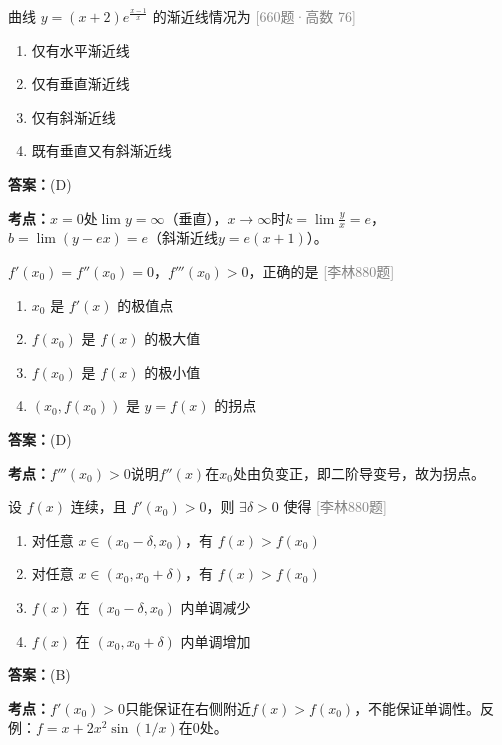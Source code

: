 \documentclass[12pt,a4paper]{ctexbook}
\newcommand{\src}[1]{\hfill\textcolor{gray}{\small\textsf{[#1]}}}
\newcommand{\ans}[1]{\begin{answerbox}\textbf{答案：}#1\end{answerbox}}
\newcommand{\kpt}[1]{\textbf{考点：}#1}
\begin{document}
\bigskip

\begin{exercise}[660题·渐近线概念]
曲线 $y=(x+2)e^{\frac{x-1}{x}}$ 的渐近线情况为 \hfill\src{660题·高数 76}
\begin{enumerate}[label=(\Alph*),nosep]
  \item 仅有水平渐近线
  \item 仅有垂直渐近线
  \item 仅有斜渐近线
  \item 既有垂直又有斜渐近线
\end{enumerate}
\end{exercise}
\ans{(D)}
\kpt{$x=0$处$\lim y=\infty$（垂直），$x\to\infty$时$k=\lim\frac{y}{x}=e$，$b=\lim(y-ex)=e$（斜渐近线$y=e(x+1)$）。}

\bigskip

\begin{exercise}[880题·极值与拐点必要条件]
$f'(x_0)=f''(x_0)=0$，$f'''(x_0)>0$，正确的是 \hfill\src{李林880题}
\begin{enumerate}[label=(\Alph*),nosep]
  \item $x_0$ 是 $f'(x)$ 的极值点
  \item $f(x_0)$ 是 $f(x)$ 的极大值
  \item $f(x_0)$ 是 $f(x)$ 的极小值
  \item $(x_0,f(x_0))$ 是 $y=f(x)$ 的拐点
\end{enumerate}
\end{exercise}
\ans{(D)}
\kpt{$f'''(x_0)>0$说明$f''(x)$在$x_0$处由负变正，即二阶导变号，故为拐点。}

\bigskip

\begin{exercise}[880题·导数保号性与单调性]
设 $f(x)$ 连续，且 $f'(x_0)>0$，则 $\exists\delta>0$ 使得 \hfill\src{李林880题}
\begin{enumerate}[label=(\Alph*),nosep]
  \item 对任意 $x\in(x_0-\delta,x_0)$，有 $f(x)>f(x_0)$
  \item 对任意 $x\in(x_0,x_0+\delta)$，有 $f(x)>f(x_0)$
  \item $f(x)$ 在 $(x_0-\delta,x_0)$ 内单调减少
  \item $f(x)$ 在 $(x_0,x_0+\delta)$ 内单调增加
\end{enumerate}
\end{exercise}
\ans{(B)}
\kpt{$f'(x_0)>0$只能保证在右侧附近$f(x)>f(x_0)$，不能保证单调性。反例：$f=x+2x^2\sin(1/x)$在$0$处。}

\bigskip
\end{document}
